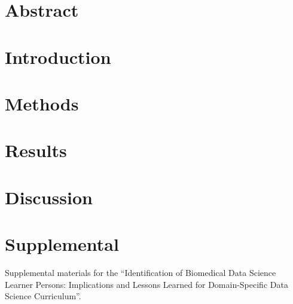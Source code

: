 \documentclass[../main.tex]{subfiles}
\begin{document}
\section*{Abstract}

\section{Introduction}



\section{Methods}

    

\section{Results}

    

\section{Discussion}

    

\section{Supplemental}

    Supplemental materials for the
    ``Identification of Biomedical Data Science Learner Persons:
             Implications and Lessons Learned for Domain-Specific Data Science Curriculum''.

    
\end{document}
